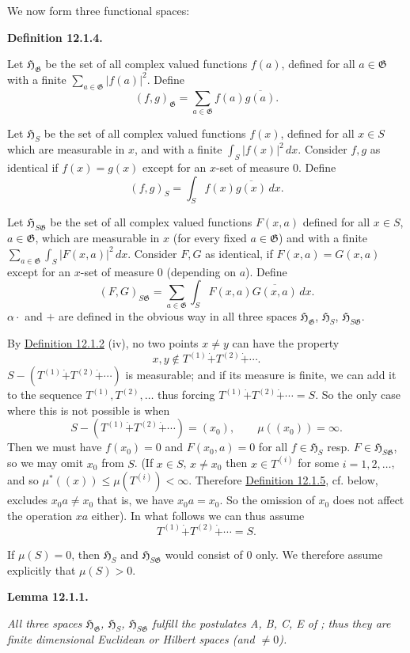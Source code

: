 \documentclass[12pt,b5paper,twoside]{article}
\newcommand{\Hspace}{\mathfrak H}
\newcommand{\Definition}[1]{%
  \par\smallskip\noindent\phantomsection\label{def:#1}\textbf{Definition #1.}\enspace
}
\newcommand{\Lemma}[1]{%
  \par\smallskip\noindent\phantomsection\label{lem:#1}\textbf{Lemma #1.}\enspace
}
\newcommand{\defref}[1]{\hyperref[def:#1]{Definition #1}}
\begin{document}
We now form three functional spaces:

\Definition{12.1.4}
Let $\Hspace_{\mathfrak G}$ be the set of all complex valued functions $f(a)$,
defined for all $a\in\mathfrak G$ with a finite
$\sum_{a\in\mathfrak G}|f(a)|^2$. Define
\[
 (f,g)_{\mathfrak G}=\sum_{a\in\mathfrak G}f(a)\overline{g(a)}.
\]

Let $\Hspace_S$ be the set of all complex valued functions $f(x)$, defined for
all $x\in S$ which are measurable in $x$, and with a finite
$\int_S|f(x)|^2\,dx$. Consider $f,g$ as identical if $f(x)=g(x)$ except for an
$x$-set of measure $0$. Define
\[
 (f,g)_S=\int_S f(x)\overline{g(x)}\,dx.
\]

Let $\Hspace_{S\mathfrak G}$ be the set of all complex valued functions
$F(x,a)$ defined for all $x\in S$, $a\in\mathfrak G$, which are measurable in
$x$ (for every fixed $a\in\mathfrak G$) and with a finite
$\sum_{a\in\mathfrak G}\int_S|F(x,a)|^2\,dx$. Consider $F,G$ as identical,
if $F(x,a)=G(x,a)$ except for an $x$-set of measure $0$ (depending on $a$).
Define
\[
 (F,G)_{S\mathfrak G}
 =\sum_{a\in\mathfrak G}\int_SF(x,a)\overline{G(x,a)}\,dx.
\]
$\alpha\cdot$ and $+$ are defined in the obvious way in all three spaces
$\Hspace_{\mathfrak G}$, $\Hspace_S$, $\Hspace_{S\mathfrak G}$.

By \defref{12.1.2} (iv), no two points $x\neq y$ can have the property
\[
 x,y\notin T^{(1)}\mathbin{\dot+}T^{(2)}\mathbin{\dot+}\cdots.
\]
$S-(T^{(1)}\mathbin{\dot+}T^{(2)}\mathbin{\dot+}\cdots)$ is measurable; and
if its measure is finite, we can add it to the sequence
$T^{(1)},T^{(2)},\ldots$ thus forcing
$T^{(1)}\mathbin{\dot+}T^{(2)}\mathbin{\dot+}\cdots=S$. So the only case
where this is not possible is when
\[
 S-(T^{(1)}\mathbin{\dot+}T^{(2)}\mathbin{\dot+}\cdots)=(x_0),
 \qquad \mu((x_0))=\infty.
\]
Then we must have $f(x_0)=0$ and $F(x_0,a)=0$ for all
$f\in\Hspace_S$ resp. $F\in\Hspace_{S\mathfrak G}$, so we may omit $x_0$
from $S$. (If $x\in S$, $x\neq x_0$ then $x\in T^{(i)}$ for some
$i=1,2,\ldots$, and so $\mu^*((x))\leq\mu(T^{(i)})<\infty$. Therefore
\defref{12.1.5}, cf. below, excludes $x_0a\neq x_0$ that is, we have
$x_0a=x_0$. So the omission of $x_0$ does not affect the operation $xa$
either). In what follows we can thus assume
\[
 T^{(1)}\mathbin{\dot+}T^{(2)}\mathbin{\dot+}\cdots=S.
\]

If $\mu(S)=0$, then $\Hspace_S$ and $\Hspace_{S\mathfrak G}$ would consist
of $0$ only. We therefore assume explicitly that $\mu(S)>0$.

\Lemma{12.1.1}
\emph{All three spaces $\Hspace_{\mathfrak G}$, $\Hspace_S$,
$\Hspace_{S\mathfrak G}$ fulfill the postulates A, B, C, E of
\cite[pp.~64--66]{ref16}; thus they are finite dimensional Euclidean or
Hilbert spaces (and $\neq0$).}
\end{document}
